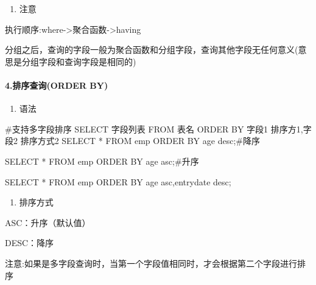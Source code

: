 \documentclass[
  letterpaper,
  DIV=11,
  numbers=noendperiod]{scrreprt}
\let\oldparagraph\paragraph
\renewcommand{\paragraph}[1]{\oldparagraph{#1}\mbox{}}
\newenvironment{Shaded}{\begin{snugshade}}{\end{snugshade}}
\newcommand{\KeywordTok}[1]{\textcolor[rgb]{0.00,0.23,0.31}{#1}}
\newcommand{\NormalTok}[1]{\textcolor[rgb]{0.00,0.23,0.31}{#1}}
\newcommand{\OperatorTok}[1]{\textcolor[rgb]{0.37,0.37,0.37}{#1}}
\providecommand{\tightlist}{%
  \setlength{\itemsep}{0pt}\setlength{\parskip}{0pt}}\usepackage{longtable,booktabs,array}
\begin{document}
\begin{enumerate}
\def\labelenumi{\arabic{enumi}.}
\setcounter{enumi}{2}
\tightlist
\item
  注意
\end{enumerate}

执行顺序:where-\textgreater 聚合函数-\textgreater having

分组之后，查询的字段一般为聚合函数和分组字段，查询其他字段无任何意义(意思是分组字段和查询字段是相同的)

\hypertarget{ux6392ux5e8fux67e5ux8be2order-by}{%
\paragraph{4.排序查询(ORDER
BY)}\label{ux6392ux5e8fux67e5ux8be2order-by}}

\begin{enumerate}
\def\labelenumi{\arabic{enumi}.}
\tightlist
\item
  语法
\end{enumerate}

\begin{Shaded}
\begin{Highlighting}[]
\NormalTok{\#支持多字段排序}
\KeywordTok{SELECT}\NormalTok{ 字段列表 }\KeywordTok{FROM}\NormalTok{ 表名 }\KeywordTok{ORDER} \KeywordTok{BY}\NormalTok{ 字段1 排序方1,字段2 排序方式2 }\KeywordTok{SELECT} \OperatorTok{*} \KeywordTok{FROM}\NormalTok{ emp }\KeywordTok{ORDER} \KeywordTok{BY}\NormalTok{ age }\KeywordTok{desc}\NormalTok{;\#降序}

\KeywordTok{SELECT} \OperatorTok{*} \KeywordTok{FROM}\NormalTok{ emp }\KeywordTok{ORDER} \KeywordTok{BY}\NormalTok{ age }\KeywordTok{asc}\NormalTok{;\#升序}

\KeywordTok{SELECT} \OperatorTok{*} \KeywordTok{FROM}\NormalTok{ emp }\KeywordTok{ORDER} \KeywordTok{BY}\NormalTok{ age }\KeywordTok{asc}\NormalTok{,entrydate }\KeywordTok{desc}\NormalTok{;}
\end{Highlighting}
\end{Shaded}

\begin{enumerate}
\def\labelenumi{\arabic{enumi}.}
\setcounter{enumi}{1}
\tightlist
\item
  排序方式
\end{enumerate}

ASC：升序（默认值）

DESC：降序

注意:如果是多字段查询时，当第一个字段值相同时，才会根据第二个字段进行排序
\end{document}
